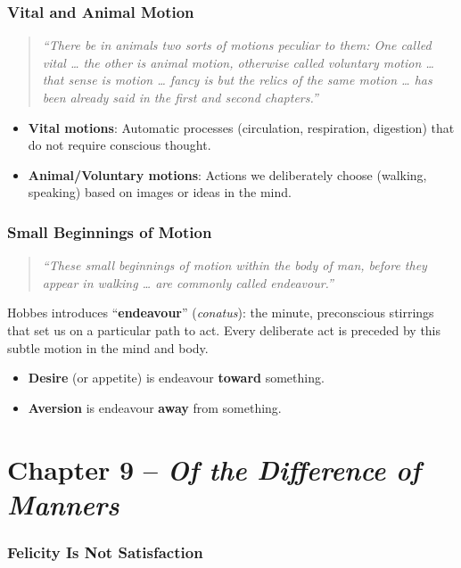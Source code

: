 \subsubsection*{Vital and Animal Motion}

\begin{quote}
\textit{“There be in animals two sorts of motions peculiar to them: One called vital … the other is animal motion, otherwise called voluntary motion … that sense is motion … fancy is but the relics of the same motion … has been already said in the first and second chapters.”}
\end{quote}

\begin{itemize}
  \item \textbf{Vital motions}: Automatic processes (circulation, respiration, digestion) that do not require conscious thought.
  \item \textbf{Animal/Voluntary motions}: Actions we deliberately choose (walking, speaking) based on images or ideas in the mind.
\end{itemize}

\subsubsection*{Small Beginnings of Motion}

\begin{quote}
\textit{“These small beginnings of motion within the body of man, before they appear in walking … are commonly called endeavour.”}
\end{quote}

Hobbes introduces “\textbf{endeavour}” (\textit{conatus}): the minute, preconscious stirrings that set us on a particular path to act. Every deliberate act is preceded by this subtle motion in the mind and body.

\begin{itemize}
  \item \textbf{Desire} (or appetite) is endeavour \textbf{toward} something.
  \item \textbf{Aversion} is endeavour \textbf{away} from something.
\end{itemize}

\section*{Chapter 9 -- \textit{Of the Difference of Manners}}

\subsubsection*{Felicity Is Not Satisfaction}

